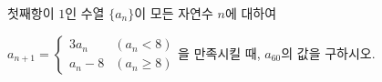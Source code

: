 첫째항이 $1$인 수열 $\{a_n\}$이 모든 자연수 $n$에 대하여 \par\smallskip\noindent\hspace*{1.5em}$a_{n+1}=\begin{cases} 3a_n & (a_n<8) \\ a_n-8 & (a_n\ge 8) \end{cases}$을 만족시킬 때, $a_{60}$의 값을 구하시오.
